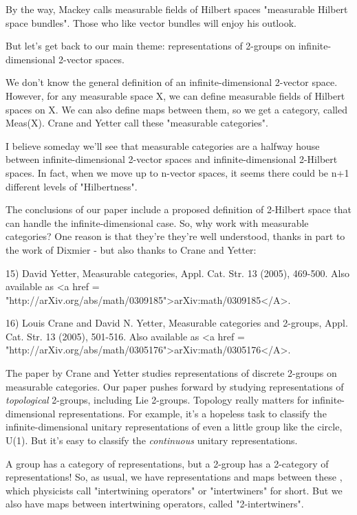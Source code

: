 By the way, Mackey calls measurable fields of Hilbert spaces
"measurable Hilbert space bundles".  Those who like vector
bundles will enjoy his outlook.

But let's get back to our main theme: representations of 2-groups
on infinite-dimensional 2-vector spaces.  

We don't know the general definition of an infinite-dimensional 
2-vector space.  However, for any measurable space X, we can 
define measurable fields of Hilbert spaces on X.  We can also define
maps between them, so we get a category, called Meas(X).  Crane and 
Yetter call these "measurable categories".

I believe someday we'll see that measurable categories are a 
halfway house between infinite-dimensional 2-vector spaces and 
infinite-dimensional 2-Hilbert spaces.  In fact, when we move 
up to n-vector spaces, it seems there could be n+1 different levels 
of "Hilbertness".  

The conclusions of our paper include a proposed definition of
2-Hilbert space that can handle the infinite-dimensional case.  
So, why work with measurable categories?  One reason is that they're 
they're well understood, thanks in part to the work of Dixmier - but 
also thanks to Crane and Yetter:

15) David Yetter, Measurable categories, Appl. Cat. Str. 13 (2005), 
469-500.  Also available as <a href = "http://arXiv.org/abs/math/0309185">arXiv:math/0309185</A>.

16) Louis Crane and David N. Yetter, Measurable categories and 
2-groups, Appl. Cat. Str. 13 (2005), 501-516.  Also available as
<a href = "http://arXiv.org/abs/math/0305176">arXiv:math/0305176</A>.

The paper by Crane and Yetter studies representations of discrete
2-groups on measurable categories.  Our paper pushes forward by
studying representations of \emph{topological} 2-groups, including
Lie 2-groups.  Topology really matters for infinite-dimensional
representations.  For example, it's a hopeless task to classify the
infinite-dimensional unitary representations of even a little group
like the circle, U(1).  But it's easy to classify the
\emph{continuous} unitary representations.

A group has a category of representations, but a 2-group has a
2-category of representations!  So, as usual, we have representations
and maps between these , which physicists call "intertwining
operators" or "intertwiners" for short.  But we also
have maps between intertwining operators, called
"2-intertwiners".


